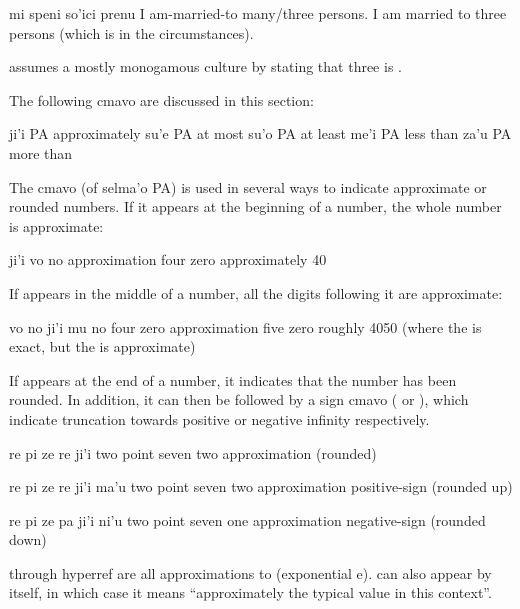 \begin{example}
mi speni so'ici prenu\n
I am-married-to many/three persons.\n
I am married to three persons\n
\T	(which is  in the circumstances).
\end{example}

 assumes a mostly monogamous
    culture by stating that three is .



The following cmavo are discussed in this section:

   ji'i    PA  approximately
    su'e    PA  at most
    su'o    PA  at least
    me'i    PA  less than
    za'u    PA  more than

The cmavo  (of selma'o PA) is used in several ways to
    indicate approximate or rounded numbers. If it appears at the
    beginning of a number, the whole number is approximate:
\begin{example}
ji'i vo no\n
approximation four zero\n
approximately 40
\end{example}

If  appears in the middle of a number, all the digits
    following it are approximate:
\begin{example}
vo no ji'i mu no\n
four zero approximation five zero\n
roughly 4050\n
\T	(where the  is exact,\n
\T	but the  is approximate)
\end{example}

If  appears at the end of a number, it indicates that
    the number has been rounded. In addition, it can then be
    followed by a sign cmavo ( or ), which indicate
    truncation towards positive or negative infinity respectively.
\begin{example}
re pi ze re ji'i\n
two point seven two approximation (rounded)
\end{example}

\begin{example}
re pi ze re ji'i ma'u\n
two point seven two approximation positive-sign (rounded up)
\end{example}

\begin{example}
re pi ze pa ji'i ni'u\n
two point seven one approximation negative-sign (rounded down)
\end{example}

 through hyperref are all approximations to 
    (exponential e).  can also appear by itself, in which
    case it means ``approximately the typical value in this
    context''. 

